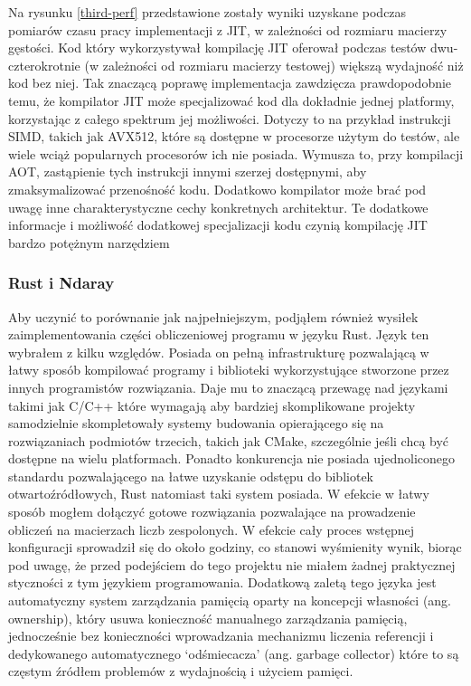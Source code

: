 \documentclass[11pt, a4paper]{article}
\begin{document}
\begin{sloppypar}
    Na rysunku \ref{third-perf} przedstawione zostały wyniki uzyskane podczas pomiarów
    czasu pracy implementacji z JIT, w zależności od rozmiaru macierzy gęstości. Kod
    który wykorzystywał kompilację JIT oferował podczas testów dwu-czterokrotnie (w zależności
    od rozmiaru macierzy testowej) większą wydajność niż kod bez niej. Tak znaczącą poprawę
    implementacja zawdzięcza prawdopodobnie temu, że kompilator JIT może specjalizować
    kod dla dokładnie jednej platformy, korzystając z całego spektrum jej możliwości.
    Dotyczy to na przykład instrukcji SIMD, takich jak AVX512, które są dostępne w
    procesorze użytym do testów, ale wiele wciąż popularnych procesorów ich nie posiada.
    Wymusza to, przy kompilacji AOT, zastąpienie tych instrukcji innymi szerzej
    dostępnymi, aby zmaksymalizować przenośność kodu. Dodatkowo kompilator może brać pod
    uwagę inne charakterystyczne cechy konkretnych architektur. Te dodatkowe informacje i
    możliwość dodatkowej specjalizacji kodu czynią kompilację JIT bardzo potężnym narzędziem

    \subsubsection{ Rust i Ndaray}


    Aby uczynić to porównanie jak najpełniejszym, podjąłem również wysiłek zaimplementowania
    części obliczeniowej programu w języku Rust. Język ten wybrałem z kilku względów. Posiada
    on pełną infrastrukturę pozwalającą w łatwy sposób kompilować programy i biblioteki wykorzystujące
    stworzone przez innych programistów rozwiązania. Daje mu to znaczącą przewagę nad
    językami takimi jak C/C++ które wymagają aby bardziej skomplikowane projekty
    samodzielnie skompletowały systemy budowania opierającego się na rozwiązaniach
    podmiotów trzecich, takich jak CMake, szczególnie jeśli chcą być dostępne na wielu
    platformach. Ponadto konkurencja nie posiada ujednoliconego standardu pozwalającego na
    łatwe uzyskanie odstępu do bibliotek otwartoźródłowych, Rust natomiast taki system
    posiada. W efekcie w łatwy sposób mogłem dołączyć gotowe rozwiązania pozwalające na prowadzenie
    obliczeń na macierzach liczb zespolonych. W efekcie cały proces wstępnej
    konfiguracji sprowadził się do około godziny, co stanowi wyśmienity wynik, biorąc
    pod uwagę, że przed podejściem do tego projektu nie miałem żadnej praktycznej styczności
    z tym językiem programowania. Dodatkową zaletą tego języka jest automatyczny system
    zarządzania pamięcią oparty na koncepcji własności (ang. ownership), który usuwa
    konieczność manualnego zarządzania pamięcią, jednocześnie bez konieczności wprowadzania
    mechanizmu liczenia referencji i dedykowanego automatycznego `odśmiecacza' (ang. garbage
    collector) które to są częstym źródłem problemów z wydajnością i użyciem pamięci.


\end{sloppypar}
\end{document}
